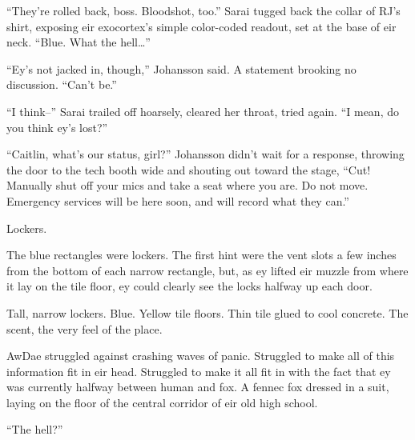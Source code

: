 ``They're rolled back, boss. Bloodshot, too.'' Sarai tugged back the collar of RJ's shirt, exposing eir exocortex's simple color-coded readout, set at the base of eir neck. ``Blue. What the hell\ldots{}''

``Ey's not jacked in, though,'' Johansson said. A statement brooking no discussion. ``Can't be.''

``I think--'' Sarai trailed off hoarsely, cleared her throat, tried again. ``I mean, do you think ey's lost?''

``Caitlin, what's our status, girl?'' Johansson didn't wait for a response, throwing the door to the tech booth wide and shouting out toward the stage, ``Cut! Manually shut off your mics and take a seat where you are. Do not move. Emergency services will be here soon, and will record what they can.''

Lockers.

The blue rectangles were lockers. The first hint were the vent slots a few inches from the bottom of each narrow rectangle, but, as ey lifted eir muzzle from where it lay on the tile floor, ey could clearly see the locks halfway up each door.

Tall, narrow lockers. Blue. Yellow tile floors. Thin tile glued to cool concrete. The scent, the very feel of the place.

AwDae struggled against crashing waves of panic. Struggled to make all of this information fit in eir head. Struggled to make it all fit in with the fact that ey was currently halfway between human and fox. A fennec fox dressed in a suit, laying on the floor of the central corridor of eir old high school.

``The hell?''
